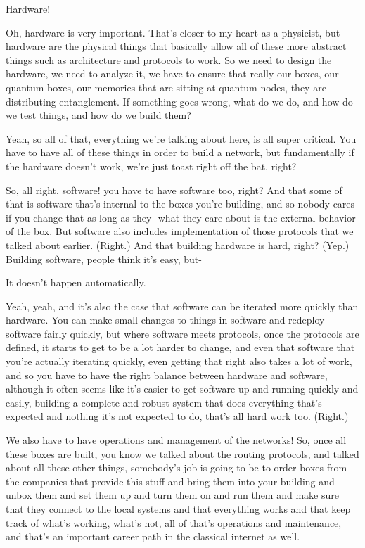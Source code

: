 Hardware!

\mmm Oh, hardware is very important. That's closer to my heart as a physicist, but hardware are the physical things that basically allow all of these more abstract things such as architecture and protocols to work. So we need to design the hardware, we need to analyze it, we have to ensure that really our boxes, our quantum boxes, our memories that are sitting at quantum nodes, they are distributing entanglement. If something goes wrong, what do we do, and how do we test things, and how do we build them?

\rrr Yeah, so all of that, everything we're talking about here, is all super critical. You have to have all of these things in order to build a network, but fundamentally if the hardware doesn't work, we're just toast right off the bat, right?

So, all right, software! you have to have software too, right? And that some of that is software that's internal to the boxes you're building, and so nobody cares if you change that as long as they- what they care about is the external behavior of the box. But software also includes implementation of those protocols that we talked about earlier. (Right.) And that building hardware is hard, right? (Yep.) Building software, people think it's easy, but-

\mmm It doesn't happen automatically.

\rrr Yeah, yeah, and it's also the case that software can be iterated more quickly than hardware. You can make small changes to things in software and redeploy software fairly quickly, but where software meets protocols, once the protocols are defined, it starts to get to be a lot harder to change, and even that software that you're actually iterating quickly, even getting that right also takes a lot of work, and so you have to have the right balance between hardware and software, although it often seems like it's easier to get software up and running quickly and easily, building a complete and robust system that does everything that's expected and nothing it's not expected to do, that's all hard work too. (Right.)

We also have to have operations and management of the networks! So, once all these boxes are built, you know we talked about the routing protocols, and talked about all these other things, somebody's job is going to be to order boxes from the companies that provide this stuff and bring them into your building and unbox them and set them up and turn them on and run them and make sure that they connect to the local systems and that everything works and that keep track of what's working, what's not, all of that's operations and maintenance, and that's an important career path in the classical internet as well.

